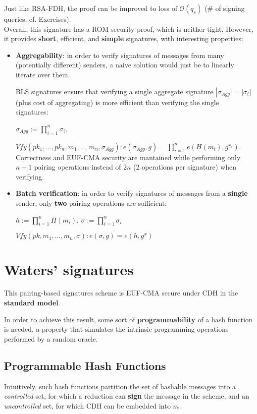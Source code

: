 \documentclass[oneside]{book}
\newcommand{\cO}[0]{\mathcal{O}}
\begin{document}
Just like RSA-FDH, the proof can be improved to loss of $\cO(q_s)$ (\# of signing queries, cf. Exercises).\\

Overall, this signature has a ROM security proof, which is neither tight. However, it provides \textbf{short}, efficient, and \textbf{simple} signatures, with interesting properties:
\begin{itemize}
    \item \textbf{Aggregability}: in order to verify signatures of messages from many (potentially different) senders, a naive solution would just be to linearly iterate over them.
    
    BLS signatures ensure that verifying a single aggregate signature $|\sigma_{Agg}| = |\sigma_i|$ (plus cost of aggregating) is more efficient than verifying the single signatures:
    
    $\sigma_{Agg} := \prod_{i = 1}^{n} \sigma_i$.
    
    $Vfy(pk_1, ..., pk_n, m_1, ..., m_n, \sigma_{Agg}): e(\sigma_{Agg}, g) = \prod_{i = 1}^{n} e(H(m_i), g^{x_i})$.\\
    
    Correctness and EUF-CMA security are mantained while performing only $n+1$ pairing operations instead of $2n$ (2 operations per signature) when verifying.
    
    \item \textbf{Batch verification}: in order to verify signatures of messages from a \textbf{single} sender, only \textbf{two} pairing operations are sufficient:
    
    $h := \prod_{i=1}^{n} H(m_i)$, $\sigma := \prod_{i = 1}^{n} \sigma_i$
    
    $Vfy(pk, m_1, ..., m_n, \sigma): e(\sigma, g) = e(h, g^x)$
\end{itemize}

\section{Waters' signatures}
This pairing-based signatures scheme is EUF-CMA secure under CDH in the \textbf{standard model}.

In order to achieve this result, some sort of \textbf{programmability} of a hash function is needed, a property that simulates the intrinsic programming operations performed by a random oracle.

\subsection{Programmable Hash Functions}
Intuitively, such hash functions partition the set of hashable messages into a \textit{controlled} set, for which a reduction can \textbf{sign} the message in the scheme, and an \textit{uncontrolled} set, for which CDH can be embedded into $m$.\\
\end{document}
